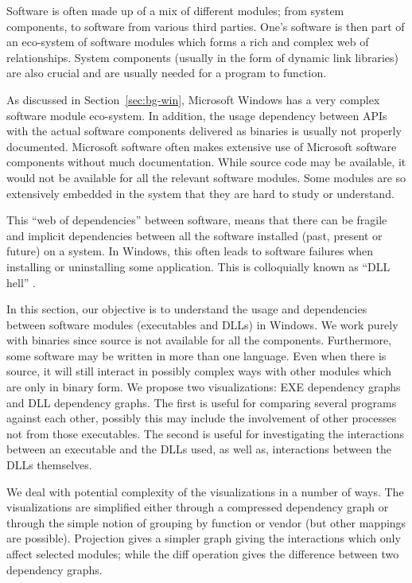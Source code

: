 
Software is often made up of
a mix of different modules; from system components, to
software from various third parties.
One's software is then part of an eco-system of software modules
which forms a rich and complex web of relationships.
System components (usually in the form of dynamic link libraries)
are also crucial and are usually needed for
a program to function.

As discussed in Section~\ref{sec:bg-win},
Microsoft Windows has a very complex software module eco-system.
In addition, the usage dependency between
APIs with the actual software components delivered as binaries
is usually not properly documented.
Microsoft software often makes extensive
use of Microsoft software components without much documentation.
While source code may be available, it would not be available for all
the relevant software modules.
Some modules are so extensively embedded in the system that they are
hard to study or understand.

This ``web of dependencies'' between software,
means that
there can be fragile and implicit dependencies between all the software
installed (past, present or future) on a system.
In Windows, this often leads to software failures when installing or
uninstalling some application.
This is colloquially known as ``DLL hell'' \cite{anderson2000end}.

In this section, our objective is to understand the usage and dependencies
between software modules (executables and DLLs) in Windows.
We work purely with binaries since source is not available for all the
components. Furthermore, some software may be written in more than
one language.
Even when there is source, it will still interact in possibly complex
ways with other modules which are only in binary form.
We propose two visualizations: EXE dependency graphs and DLL dependency
graphs. The first is useful for comparing several programs
against each other, possibly this may include the involvement
of other processes not from those executables.
The second is useful for investigating the interactions between
an executable and the DLLs used, as well as, interactions
between the DLLs themselves.

We deal with potential complexity of the visualizations in a number of ways.
The visualizations are
simplified either through a compressed dependency graph
or through the simple notion of grouping by function
or vendor (but other mappings are possible).
Projection gives a simpler graph giving the interactions which
only affect selected modules; while the diff operation
gives the difference between two dependency graphs.

